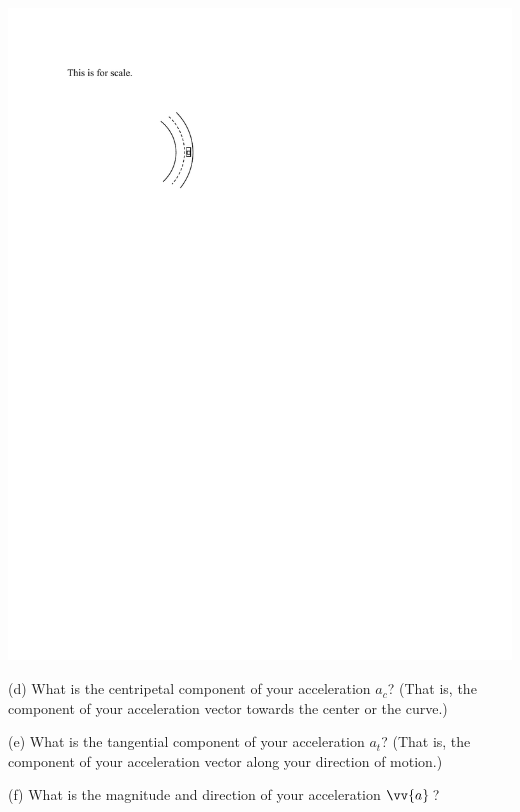 \hspace{1.0in}\includegraphics{tangential_and_centripetal_acc/curve2.pdf}

(d) What is the centripetal component of your acceleration $a_c$?  (That is, the component of your acceleration vector towards the center or the curve.)
\answerspace{0.3in}

(e) What is the tangential component of your acceleration $a_t$?  (That is, the component of your acceleration vector along your direction of motion.)
\answerspace{0.3in}

(f) What is the magnitude and direction of your acceleration $\vv{a}\,$?
\answerspace{1.5in}

\answerspace{0.5in}



